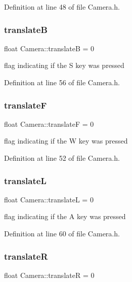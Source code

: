 Definition at line 48 of file Camera.\+h.

\mbox{\label{struct_camera_a8ff297e07c4dd94f7850fd69edb27a8e}} 
\subsubsection{translateB}
{\footnotesize\ttfamily float Camera\+::translateB = 0}



flag indicating if the S key was pressed 



Definition at line 56 of file Camera.\+h.

\mbox{\label{struct_camera_a996d8a55c56058a6309ae8f68a7b8e50}} 
\subsubsection{translateF}
{\footnotesize\ttfamily float Camera\+::translateF = 0}



flag indicating if the W key was pressed 



Definition at line 52 of file Camera.\+h.

\mbox{\label{struct_camera_abcbcd3643d3bc71f8b60ab1383b13acc}} 
\subsubsection{translateL}
{\footnotesize\ttfamily float Camera\+::translateL = 0}



flag indicating if the A key was pressed 



Definition at line 60 of file Camera.\+h.

\mbox{\label{struct_camera_ae212bbf40672342ca97d76a761328711}} 
\subsubsection{translateR}
{\footnotesize\ttfamily float Camera\+::translateR = 0}



